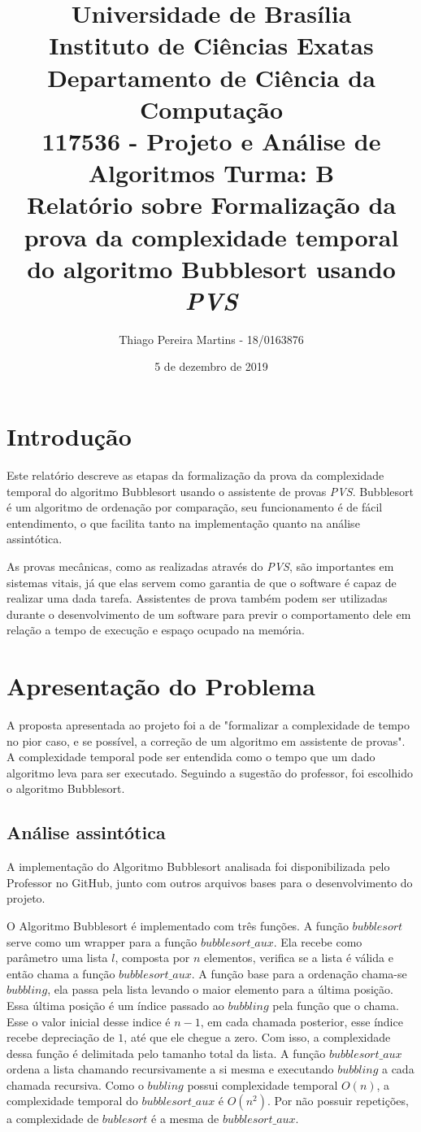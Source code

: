 \documentclass[12pt]{article}
\title{{\large Universidade de Brasília \\ Instituto de Ciências Exatas \\
Departamento de Ciência da Computação} \\[1cm]
117536 - Projeto e Análise de Algoritmos Turma: B\\[.5cm]
Relatório sobre Formalização da prova da complexidade temporal do algoritmo Bubblesort usando \emph{PVS}}
\author{Thiago Pereira Martins - 18/0163876}
\date{5 de dezembro de 2019}
\begin{document}
\maketitle

\section{Introdução}
Este relatório descreve as etapas da formalização da prova da complexidade temporal do algoritmo Bubblesort usando o assistente de provas \emph{PVS}. Bubblesort é um algoritmo de ordenação por comparação, seu funcionamento é de fácil entendimento, o que facilita tanto na implementação quanto na análise assintótica.

As provas mecânicas, como as realizadas através do \emph{PVS}, são importantes em sistemas vitais, já que elas servem como garantia de que o software é capaz de realizar uma dada tarefa. Assistentes de prova também podem ser utilizadas durante o desenvolvimento de um software para previr o comportamento dele em relação a tempo de execução e espaço ocupado na memória.

\section{Apresentação do Problema}
A proposta apresentada ao projeto foi a de "formalizar a complexidade de tempo no pior caso, e se possível, a correção de um algoritmo em assistente de provas". A complexidade temporal pode ser entendida como o tempo que um dado algoritmo leva para ser executado. Seguindo a sugestão do professor, foi escolhido o algoritmo Bubblesort.

\subsection{Análise assintótica}
A implementação do Algoritmo Bubblesort analisada foi disponibilizada pelo Professor no GitHub, junto com outros arquivos bases para o desenvolvimento do projeto.

O Algoritmo Bubblesort é implementado com três funções.
A função $bubblesort$ serve como um wrapper para a função $bubblesort\_aux$. Ela recebe como parâmetro uma lista $l$, composta por $n$ elementos, verifica se a lista é válida e então chama a função $bubblesort\_aux$. A função base para a ordenação chama-se $bubbling$, ela passa pela lista levando o maior elemento para a última posição. Essa última posição é um índice passado ao $bubbling$ pela função que o chama. Esse o valor inicial desse indice é $n-1$, em cada chamada posterior, esse índice recebe depreciação de $1$, até que ele chegue a zero. Com isso, a complexidade dessa função é delimitada pelo tamanho total da lista. A função $bubblesort\_aux$ ordena a lista chamando recursivamente a si mesma e executando $bubbling$ a cada chamada recursiva. Como o $bubling$ possui complexidade temporal $O(n)$, a complexidade temporal do $bubblesort\_aux$ é $O(n^2)$. Por não possuir repetições, a complexidade de $bublesort$ é a mesma de $bubblesort\_aux$.
\end{document}
